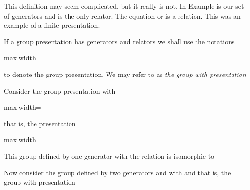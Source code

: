 \documentclass[11pt,oneside]{article}
\begin{document}
\begin{BookBody}

This definition may seem complicated, but it really is not. In Example  is our set of generators and  is the only relator. The equation  or  is a relation. This was an example of a finite presentation.

If a group presentation has generators  and relators  we shall use the notations

\begin{center}\begin{adjustbox}{max width=\linewidth}\end{adjustbox}\end{center}

\noindent to denote the group presentation. We may refer to  as\textit{ the group with presenta}\textit{tion} 


 Consider the group presentation with

\begin{center}\begin{adjustbox}{max width=\linewidth}\end{adjustbox}\end{center}

\noindent that is, the presentation

\begin{center}\begin{adjustbox}{max width=\linewidth}\end{adjustbox}\end{center}

\noindent This group defined by one generator  with the relation  is isomorphic to 

Now consider the group defined by two generators  and  with  and  that is, the group with presentation


\end{BookBody}
\end{document}
